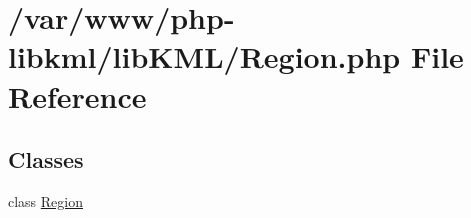 \hypertarget{Region_8php}{
\section{/var/www/php-\/libkml/libKML/Region.php File Reference}
\label{d5/d52/Region_8php}
}
\subsection*{Classes}
\begin{DoxyCompactItemize}
\item 
class \hyperlink{classRegion}{Region}
\end{DoxyCompactItemize}
